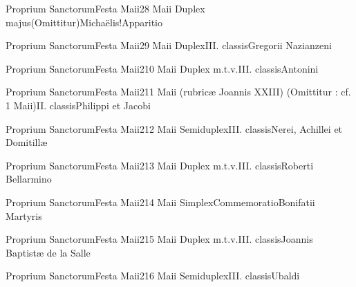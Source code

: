 \documentclass[liber-responsorialis_sanctorale.tex]{subfiles}
\begin{document}
	{Proprium Sanctorum}{Festa Maii}{2}{8 Maii}
	{Duplex majus}{(Omittitur)}{Michaëlis!Apparitio}
	{}
	{}

	{Proprium Sanctorum}{Festa Maii}{2}{9 Maii}
	{Duplex}{III. classis}{Gregorii Nazianzeni}
	{\copodorubric}
	{\respdetemp}

	{Proprium Sanctorum}{Festa Maii}{2}{10 Maii}
	{Duplex m.t.v.}{III. classis}{Antonini}
	{\coporubric}
	{\respdetemp}

	{Proprium Sanctorum}{Festa Maii}{2}{11 Maii (rubricæ Joannis XXIII)}
	{(Omittitur : cf. 1 Maii)}{II. classis}{Philippi et Jacobi}
	{}
	{}
\rubric{\aptprubric}

	{Proprium Sanctorum}{Festa Maii}{2}{12 Maii}
	{Semiduplex}{III. classis}{Nerei, Achillei et Domitillæ}
	{\mrtprubric}
	{\respdetemp}

	{Proprium Sanctorum}{Festa Maii}{2}{13 Maii}
	{Duplex m.t.v.}{III. classis}{Roberti Bellarmino}
	{\copodorubric}
	{\respdetemp}

	{Proprium Sanctorum}{Festa Maii}{2}{14 Maii}
	{Simplex}{Commemoratio}{Bonifatii Martyris}
	{}
	{}
\rubric{\respdetemp}

	{Proprium Sanctorum}{Festa Maii}{2}{15 Maii}
	{Duplex m.t.v.}{III. classis}{Joannis Baptistæ de la Salle}
	{\conprubric}
	{\respdetemp}

	{Proprium Sanctorum}{Festa Maii}{2}{16 Maii}
	{Semiduplex}{III. classis}{Ubaldi}
	{\coporubric}
	{\respdetemp}
\end{document}
